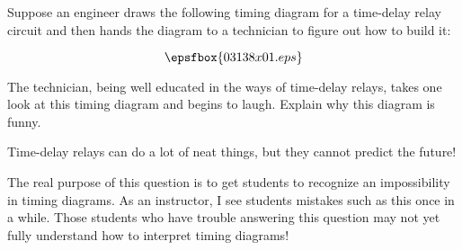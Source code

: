 

Suppose an engineer draws the following timing diagram for a time-delay relay circuit and then hands the diagram to a technician to figure out how to build it:

$$\epsfbox{03138x01.eps}$$

The technician, being well educated in the ways of time-delay relays, takes one look at this timing diagram and begins to laugh.  Explain why this diagram is funny.







Time-delay relays can do a lot of neat things, but they cannot predict the future!







The real purpose of this question is to get students to recognize an impossibility in timing diagrams.  As an instructor, I see students mistakes such as this once in a while.  Those students who have trouble answering this question may not yet fully understand how to interpret timing diagrams!




